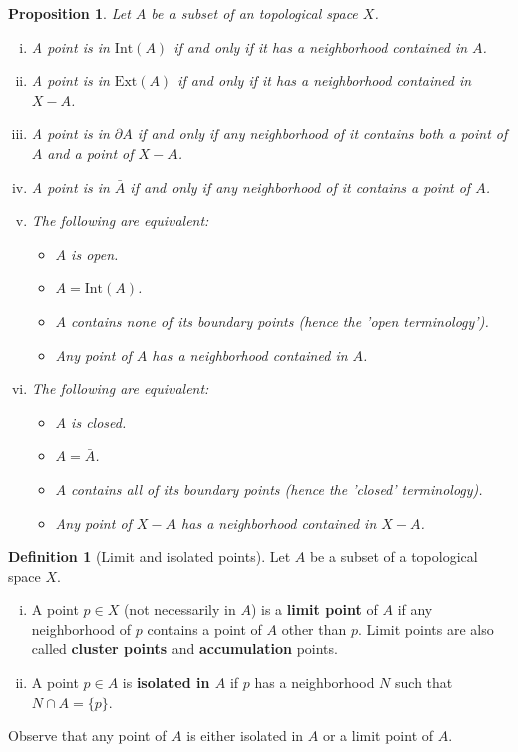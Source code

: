 \documentclass[a4paper,12pt,parskip=half*,chapterprefix=true,numbers=noendperiod]{scrreprt}
\newtheorem{proposition}{Proposition}[section]
\theoremstyle{definition}
\newtheorem{definition}{Definition}[section]
\theoremstyle{remark}
\begin{document}
\begin{proposition}
Let $A$ be a subset of an topological space $X$.
\begin{enumerate}[(i)]
	\item A point is in $\text{Int}(A)$ if and only if it has a neighborhood contained in $A$.
	\item A point is in $\text{Ext}(A)$ if and only if it has a neighborhood contained in $X-A$.
	\item A point is in $\partial A$ if and only if any neighborhood of it contains both a point of $A$ and a point of $X-A$.
	\item A point is in $\bar{A}$ if and only if any neighborhood of it contains a point of $A$.
	\item The following are equivalent:
	\begin{itemize}
		\item $A$ is open.
		\item $A=\text{Int}(A)$.
		\item $A$ contains none of its boundary points (hence the 'open terminology').
		\item Any point of $A$ has a neighborhood contained in $A$.
	\end{itemize}
	\item The following are equivalent:
	\begin{itemize}
		\item $A$ is closed.
		\item $A=\bar{A}$.
		\item $A$ contains all of its boundary points (hence the 'closed' terminology).
		\item Any point of $X-A$ has a neighborhood contained in $X-A$.
	\end{itemize}
\end{enumerate}
\end{proposition}

\begin{definition}[Limit and isolated points]
Let $A$ be a subset of a topological space $X$.
\begin{enumerate}[(i)]
	\item A point $p\in X$ (not necessarily in $A$) is a \textbf{limit point} of $A$ if any neighborhood of $p$ contains a point of $A$ other than $p$. Limit points are also called \textbf{cluster points} and \textbf{accumulation} points.
	\item A point $p\in A$ is \textbf{isolated in $A$} if $p$ has a neighborhood $N$ such that $N\cap A=\{p\}$. 
\end{enumerate}
Observe that any point of $A$ is either isolated in $A$ or a limit point of $A$.
\end{definition}
\end{document}
